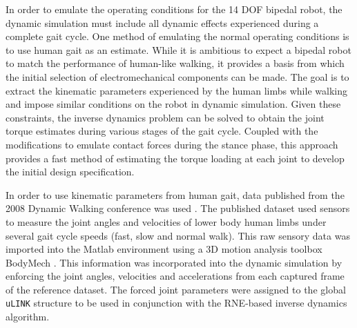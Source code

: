 In order to emulate the operating conditions for the 14 DOF bipedal robot, the dynamic simulation must include all dynamic effects experienced during a complete gait cycle. One method of emulating the normal operating conditions is to use human gait as an estimate. While it is ambitious to expect a bipedal robot to match the performance of human-like walking, it provides a basis from which the initial selection of electromechanical components can be made. The goal is to extract the kinematic parameters experienced by the human limbs while walking and impose similar conditions on the robot in dynamic simulation. Given these constraints, the inverse dynamics problem can be solved to obtain the joint torque estimates during various stages of the gait cycle. Coupled with the modifications to emulate contact forces during the stance phase, this approach provides a fast method of estimating the torque loading at each joint to develop the initial design specification. 
	
In order to use kinematic parameters from human gait, data published from the 2008 Dynamic Walking conference was used \cite{dw2008}. The published dataset used sensors to measure the joint angles and velocities of lower body human limbs under several gait cycle speeds (fast, slow and normal walk). This raw sensory data was imported into the Matlab environment using a 3D motion analysis toolbox BodyMech \cite{bodymech}. This information was incorporated into the dynamic simulation by enforcing the joint angles, velocities and accelerations from each captured frame of the reference dataset. The forced joint parameters were assigned to the global \texttt{uLINK} structure to be used in conjunction with the RNE-based inverse dynamics algorithm. 


